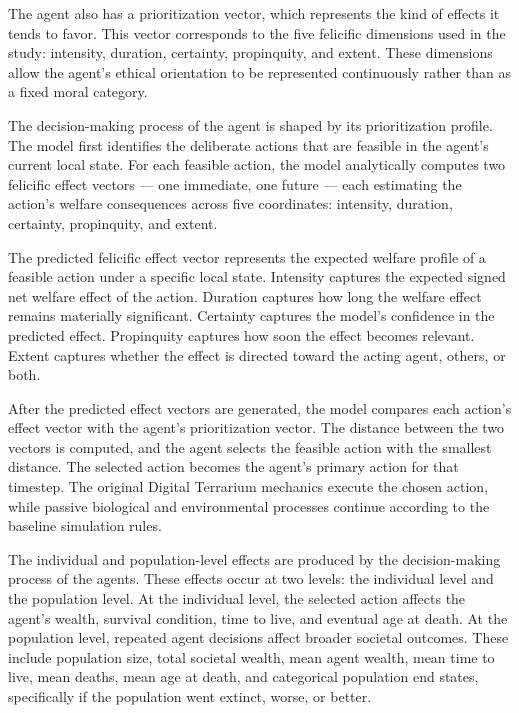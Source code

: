 \documentclass{icsthesis}
\begin{document}
\begin{mainmatter}
The agent also has a prioritization vector, which represents the kind of effects it tends to favor. This vector corresponds to the five felicific dimensions used in the study: intensity, duration, certainty, propinquity, and extent. These dimensions allow the agent’s ethical orientation to be represented continuously rather than as a fixed moral category.

The decision-making process of the agent is shaped by its prioritization profile. The model first identifies the deliberate actions that are feasible in the agent’s current local state. For each feasible action, the model analytically computes two felicific effect vectors --- one immediate, one future --- each estimating the action’s welfare consequences across five coordinates: intensity, duration, certainty, propinquity, and extent.

The predicted felicific effect vector represents the expected welfare profile of a feasible action under a specific local state. Intensity captures the expected signed net welfare effect of the action. Duration captures how long the welfare effect remains materially significant. Certainty captures the model’s confidence in the predicted effect. Propinquity captures how soon the effect becomes relevant. Extent captures whether the effect is directed toward the acting agent, others, or both.

After the predicted effect vectors are generated, the model compares each action’s effect vector with the agent’s prioritization vector. The distance between the two vectors is computed, and the agent selects the feasible action with the smallest distance. The selected action becomes the agent’s primary action for that timestep. The original Digital Terrarium mechanics execute the chosen action, while passive biological and environmental processes continue according to the baseline simulation rules.

The individual and population-level effects are produced by the decision-making process of the agents. These effects occur at two levels: the individual level and the population level. At the individual level, the selected action affects the agent’s wealth, survival condition, time to live, and eventual age at death. At the population level, repeated agent decisions affect broader societal outcomes. These include population size, total societal wealth, mean agent wealth, mean time to live, mean deaths, mean age at death, and categorical population end states, specifically if the population went extinct, worse, or better. 


\end{mainmatter}
\end{document}
